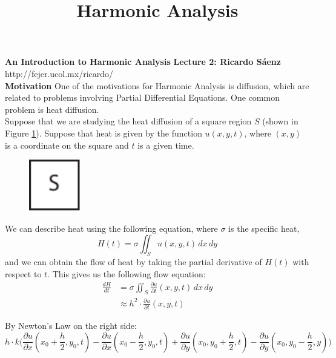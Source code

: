 \documentclass[12pt]{article}
\title{Harmonic Analysis}
\begin{document}
\noindent \textbf{An Introduction to Harmonic Analysis}
\noindent \textbf{Lecture 2: Ricardo S\'aenz} \\
\noindent http://fejer.ucol.mx/ricardo/ \\

\noindent \textbf{Motivation}
\noindent One of the motivations for Harmonic Analysis is diffusion, which are related to problems involving Partial Differential Equations. One common problem is heat diffusion. \\

\noindent Suppose that we are studying the heat diffusion of a square region $S$ (shown in Figure \ref{square}). Suppose that heat is given by the function $u(x,y,t)$, where $(x,y)$ is a coordinate on the square and $t$ is a given time.  

\begin{figure}[H]
\centering
\includegraphics[width=0.2\textwidth]{2Square.pdf}
\caption{}
\label{square}
\end{figure}

\noindent We can describe heat using the following equation, where $\sigma$ is the specific heat,
$$H(t) = \sigma \iint_S u(x,y,t)\,dx\,dy$$
\noindent and we can obtain the flow of heat by taking the partial derivative of $H(t)$ with respect to $t$. This gives us the following flow equation:
\begin{align*}
\frac{dH}{dt} &= \sigma \iint_S \frac{\partial u}{\partial t} (x,y,t) \, dx \, dy \\
&\approx h^2 \cdot \frac{\partial u}{\partial t} (x,y,t)
\end{align*}

\noindent By Newton's Law on the right side: 
$$h\cdot k \Big( \frac{\partial u}{\partial x} (x_0 + \frac{h}{2}, y_0, t) - \frac{\partial u}{\partial x} ( x_0 - \frac{h}{2}, y_0, t) + \frac{\partial u}{\partial y} (x_0, y_0 + \frac{h}{2}, t) - \frac{\partial u}{\partial y} (x_0, y_0-\frac{h}{2},y)\Big) $$
\end{document}
